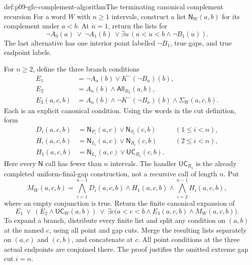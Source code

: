 \begin{hbmethod}{def:p09-gfc-complement-algorithm}{The terminating canonical complement recursion}
For a word \(W\) with \(n\geq1\) intervals, construct a list
\(\mathsf N_W(a,b)\) for its complement under \(a<b\).
At \(n=1\), return the lists for
\[
 \neg A_0(a)\ \lor\ \neg A_1(b)\
              \lor\exists u\,(a<u<b\land\neg B_1(u)).
\]
The last alternative has one interior point labelled
\(\neg B_1\), true gaps, and true endpoint labels.

For \(n\geq2\), define the three branch conditions
\[
\begin{aligned}
 E_1&=\neg A_n(b)\lor K^-(\neg B_n)(b),\\
 E_2&=A_n(b)\land\mathsf{All}_{B_n}(a,b),\\
 E_3(a,c,b)&=A_n(b)\land\neg K^-(\neg B_n)(b)
                                      \land\Sigma_W(a,c,b).
\end{aligned}
\]
Each is an explicit canonical condition. Using the words
in the cut definition, form
\[
\begin{aligned}
 D_i(a,c,b)&=\mathsf N_{P_i}(a,c)\lor\mathsf N_{S_i}(c,b)
                                      &&(1\leq i<n),\\
 H_i(a,c,b)&=\mathsf N_{L_i}(a,c)\lor\mathsf N_{R_i}(c,b)
                                      &&(2\leq i<n),\\
 H_1(a,c,b)&=\mathsf N_{L_1}(a,c)\lor\mathsf{UC}_{R_1}(c,b).
\end{aligned}
\]
Here every \(\mathsf N\) call has fewer than \(n\) intervals.
The handler \(\mathsf{UC}_{R_1}\) is the already completed
uniform-final-gap construction, not a recursive call of
length \(n\). Put
\[
 M_W(a,c,b)=
       \bigwedge_{i=1}^{n-1}D_i(a,c,b)
       \land H_1(a,c,b)
       \land\bigwedge_{i=2}^{n-1}H_i(a,c,b),
\]
where an empty conjunction is true. Return the finite
canonical expansion of
\[
 E_1\ \lor\
       (E_2\land\mathsf{UC}_W(a,b))
 \ \lor\
       \exists c\bigl(a<c<b\land E_3(a,c,b)\land M_W(a,c,b)\bigr).
\]
To expand a branch, distribute every finite list and split
any condition on \((a,b)\) at the named \(c\), using all
point and gap cuts. Merge the resulting lists separately
on \((a,c)\) and \((c,b)\), and concatenate at \(c\).
All point conditions at the three actual endpoints are
conjoined there. The proof justifies the omitted extreme
gap cut \(i=n\).
\end{hbmethod}

